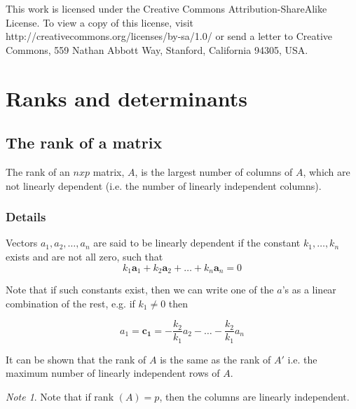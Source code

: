 \documentclass[12pt,a4paper]{article}
\theoremstyle{regla}
\theoremstyle{remark}
\newtheorem{notes}{Note}[section]
\theoremstyle{definition}
\theoremstyle{nonumberbreak}
\begin{document}
This work is licensed under the Creative Commons
Attribution-ShareAlike License. To view a copy of this license, visit
http://creativecommons.org/licenses/by-sa/1.0/ or send a letter to
Creative Commons, 559 Nathan Abbott Way, Stanford, California 94305,
USA.
\clearpage
\section{Ranks and determinants}
\subsection{The rank of a matrix}
\begin{fbox}
\begin{minipage}{0.97\textwidth}
The rank of an $n x p$ matrix, $A$, is the largest number of columns of  $A$, which are not linearly dependent (i.e. the number of linearly independent columns).
\end{minipage}
\end{fbox}
\subsubsection{Details}
Vectors $a_1, a_2, \ldots, a_n$ are said to be linearly dependent if the constant $k_1 , \ldots, k_n$ exists and are not all zero, such that 
$$ k_1\mathbf{a}_1 + k_2 \mathbf{a}_2 + \ldots + k_n\mathbf{a}_n = 0$$

Note that if such constants exist, then we can write one of the $a$'s as a linear combination of the rest, e.g. if $k_1 \neq 0$ then

$$ a_1=\mathbf{c_1} =  -\frac{k_2}{k_1} a_2 - \ldots - \frac{k_2}{k_1} a_n $$

It can be shown that the rank of  $A$ is the same as the rank of  $A'$ i.e. the maximum number of linearly independent rows of  $A$. 
\begin{notes}
Note that if rank $(A)= p$, then the columns are linearly independent.
\end{notes}
\end{document}
